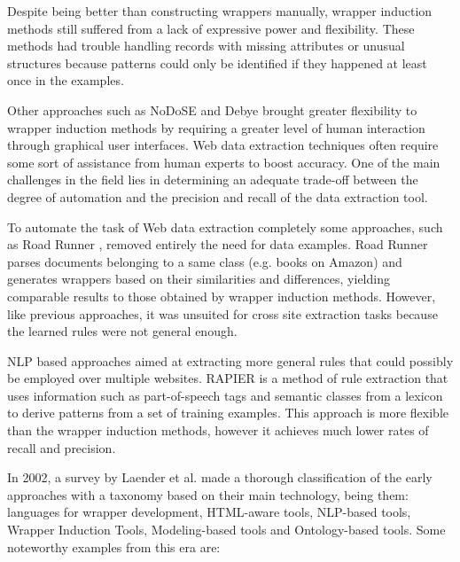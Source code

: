 \documentclass{nle}
\begin{document}
Despite being better than constructing wrappers manually, wrapper induction methods 
still suffered from a lack of expressive power and flexibility. These methods had 
trouble handling records with missing attributes or unusual structures because
patterns could only be identified if they happened at least once in the examples.

Other approaches such as NoDoSE \cite{Adelberg1998} and Debye \cite{Laender2002a} 
brought greater flexibility to wrapper induction methods by requiring a greater level 
of human interaction through graphical user interfaces. Web data extraction techniques often 
require some sort of assistance from human experts to boost accuracy. One of the main challenges 
in the field lies in determining an adequate trade-off between the degree of automation and 
the precision and recall of the data extraction tool.

To automate the task of Web data extraction completely some approaches,
such as Road Runner \cite{Crescenzi2001}, removed entirely the need for data examples.
Road Runner parses documents belonging to a same class (e.g. books on Amazon) and 
generates wrappers based on their similarities and differences, yielding comparable results 
to those obtained by wrapper induction methods. However, like previous approaches, it was 
unsuited for cross site extraction tasks because the learned rules were not general enough.

NLP based approaches aimed at extracting more general rules that could possibly
be employed over multiple websites. RAPIER \cite{Califf1999} is a method of rule
extraction that uses information such as part-of-speech tags and semantic classes from
a lexicon to derive patterns from a set of training examples. This approach is more
flexible than the wrapper induction methods, however it achieves much lower rates of 
recall and precision.

In 2002, a survey by Laender et al.  made a thorough classification of the
early approaches with a taxonomy based on their main technology, being them: languages for
wrapper development, HTML-aware tools, NLP-based tools, Wrapper Induction Tools,
Modeling-based tools and Ontology-based tools. Some noteworthy examples from this era
are: 
\end{document}
